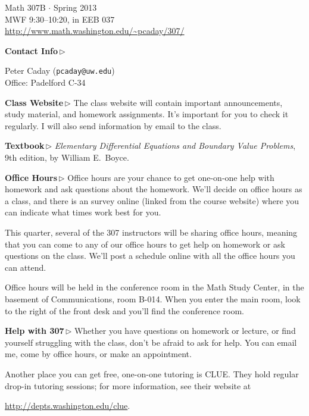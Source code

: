 \documentclass[12pt]{letter}
\renewcommand{\normalfont}{\sffamily}
\newcommand{\heading}[1]{\hspace{-0.3in}\textbf{#1}\:\,$\triangleright$\quad}  %
\newcommand{\importantnote}[1]{\vspace{-0.5em}\begin{itemize} \item[$\rightarrow$]
	\textit{#1}
\end{itemize}\vspace{-0.5em}}
\begin{document}
\normalfont
\vskip-12pt
\begin{center}
{\large\unclfamily Math 307B $\cdot$ Spring 2013}\\
MWF 9:30--10:20, in EEB 037\\
\url{http://www.math.washington.edu/~pcaday/307/}
\end{center}


\leftskip 0.3in

\heading{Contact Info} \parbox[t]{5in}{Peter Caday (\texttt{pcaday@uw.edu})\\Office: Padelford C-34}

\heading{Class Website} The class website will contain important announcements, study material, and homework assignments. It's important for you to check it regularly. I will also send information by email to the class.

\heading{Textbook} \textit{Elementary Differential Equations and Boundary Value Problems}, 9th edition, by William E.~Boyce.

\heading{Office Hours} Office hours are your chance to get one-on-one help with homework and ask questions about the homework. We'll decide on office hours as a class, and there is an survey online (linked from the course website) where you can indicate what times work best for you.

This quarter, several of the 307 instructors will be sharing office hours, meaning that you can come to any of our office hours to get help on homework or ask questions on the class. We'll post a schedule online with all the office hours you can attend.

Office hours will be held in the conference room in the Math Study Center, in the basement of Communications, room B-014. When you enter the main room, look to the right of the front desk and you'll find the conference room.


\heading{Help with 307} Whether you have questions on homework or lecture, or find yourself struggling with the class, don't be afraid to ask for help. You can email me, come by office hours, or make an appointment.

Another place you can get free, one-on-one tutoring is CLUE. They hold regular drop-in tutoring sessions; for more information, see their website at
\begin{center}
\url{http://depts.washington.edu/clue}.
\end{center}
\end{document}

